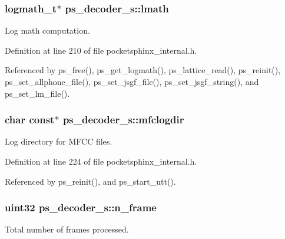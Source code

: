 \subsubsection[{lmath}]{\setlength{\rightskip}{0pt plus 5cm}logmath\-\_\-t$\ast$ ps\-\_\-decoder\-\_\-s\-::lmath}\label{structps__decoder__s_abd17fe329f2fb219c5a534f3217c5b95}


Log math computation. 



Definition at line 210 of file pocketsphinx\-\_\-internal.\-h.



Referenced by ps\-\_\-free(), ps\-\_\-get\-\_\-logmath(), ps\-\_\-lattice\-\_\-read(), ps\-\_\-reinit(), ps\-\_\-set\-\_\-allphone\-\_\-file(), ps\-\_\-set\-\_\-jsgf\-\_\-file(), ps\-\_\-set\-\_\-jsgf\-\_\-string(), and ps\-\_\-set\-\_\-lm\-\_\-file().

\subsubsection[{mfclogdir}]{\setlength{\rightskip}{0pt plus 5cm}char const$\ast$ ps\-\_\-decoder\-\_\-s\-::mfclogdir}\label{structps__decoder__s_a8bb5ef8791798b8dd9bc82b1ec016663}


Log directory for M\-F\-C\-C files. 



Definition at line 224 of file pocketsphinx\-\_\-internal.\-h.



Referenced by ps\-\_\-reinit(), and ps\-\_\-start\-\_\-utt().

\subsubsection[{n\-\_\-frame}]{\setlength{\rightskip}{0pt plus 5cm}uint32 ps\-\_\-decoder\-\_\-s\-::n\-\_\-frame}\label{structps__decoder__s_a2886b321c576c7def449ebb2f37899fd}


Total number of frames processed. 



